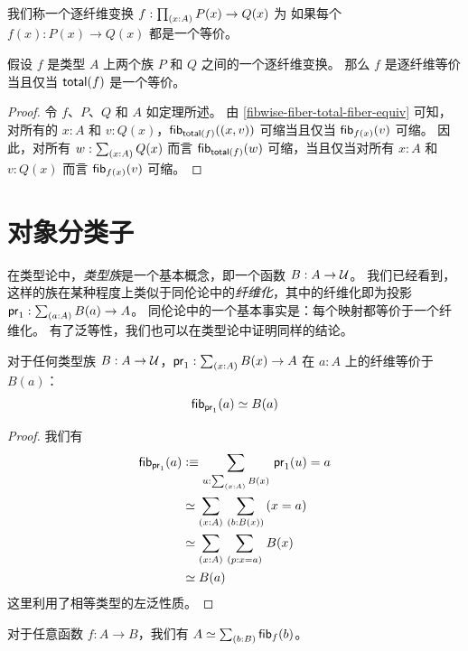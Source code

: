 我们称一个逐纤维变换 $f:\prd{x:A} P(x)\to Q(x)$ 为%
%
如果每个 $f(x):P(x) \to Q(x)$ 都是一个等价。

\begin{thm}\label{thm:total-fiber-equiv}
假设 $f$ 是类型 $A$ 上两个族 $P$ 和 $Q$ 之间的一个逐纤维变换。
那么 $f$ 是逐纤维等价当且仅当 $\mathsf{total}(f)$ 是一个等价。
\end{thm}

\begin{proof}
令 $f$、$P$、$Q$ 和 $A$ 如定理所述。
由 \cref{fibwise-fiber-total-fiber-equiv} 可知，对所有的 $x:A$ 和 $v:Q(x)$，${\mathsf{fib}}_{\mathsf{total}(f)}({\mathopen{}(x,v)\mathclose{}})$ 可缩当且仅当 ${\mathsf{fib}}_{f(x)}(v)$ 可缩。
因此，对所有 $w:\sm{x:A}Q(x)$ 而言 ${\mathsf{fib}}_{\mathsf{total}(f)}(w)$ 可缩，当且仅当对所有 $x:A$ 和 $v:Q(x)$ 而言 ${\mathsf{fib}}_{f(x)}(v)$ 可缩。
\end{proof}

%

\section{对象分类子}
\label{sec:object-classification}

在类型论中，\emph{类型族}是一个基本概念，即一个函数 $B:A\to\mathcal{U}$。
我们已经看到，这样的族在某种程度上类似于同伦论中的\emph{纤维化}，其中的纤维化即为投影 $\proj1:\sm{a:A} B(a) \to A$。
同伦论中的一个基本事实是：每个映射都等价于一个纤维化。
有了泛等性，我们也可以在类型论中证明同样的结论。

\begin{lem}\label{thm:fiber-of-a-fibration}
  对于任何类型族 $B:A\to\mathcal{U}$，$\proj1:\sm{x:A} B(x) \to A$ 在 $a:A$ 上的纤维等价于 $B(a)$：
  \[ {\mathsf{fib}}_{\mathsf{pr}_{1}}(a) \simeq B(a) \]
\end{lem}

\begin{proof}
  我们有
  \begin{align*}
    \hfib{\proj1}{a} &\defeq \sm{u:\sm{x:A} B(x)} \proj1(u)=a\\
    &\eqvsym \sm{x:A}{b:B(x)} (x=a)\\
    &\eqvsym \sm{x:A}{p:x=a} B(x)\\
    &\eqvsym B(a)
  \end{align*}
  这里利用了相等类型的左泛性质。
\end{proof}

\begin{lem}\label{thm:total-space-of-the-fibers}
  对于任意函数 $f:A\to B$，我们有 $\eqv{A}{\sm{b:B}\hfib{f}{b}}$。
\end{lem}

